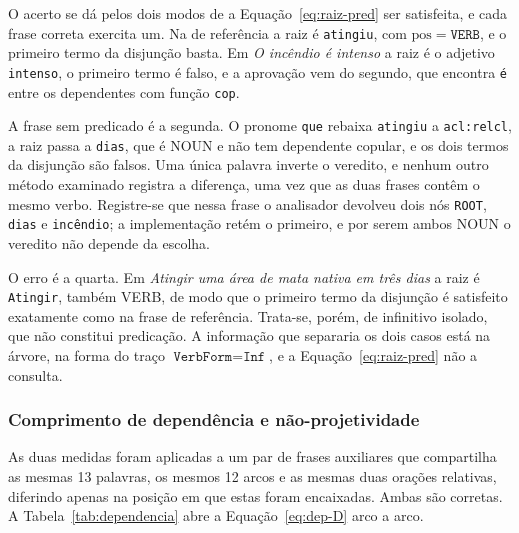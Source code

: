 O acerto se dá pelos dois modos de a Equação~\ref{eq:raiz-pred} ser satisfeita, e cada frase
correta exercita um. Na de referência a raiz é \texttt{atingiu}, com $\mathrm{pos} =
\texttt{VERB}$, e o primeiro termo da disjunção basta. Em \emph{O incêndio é intenso} a raiz é
o adjetivo \texttt{intenso}, o primeiro termo é falso, e a aprovação vem do segundo, que
encontra \texttt{é} entre os dependentes com função \texttt{cop}.

A frase sem predicado é a segunda. O pronome \texttt{que} rebaixa \texttt{atingiu} a
\texttt{acl:relcl}, a raiz passa a \texttt{dias}, que é NOUN e não tem dependente copular, e
os dois termos da disjunção são falsos. Uma única palavra inverte o veredito, e nenhum outro
método examinado registra a diferença, uma vez que as duas frases contêm o mesmo verbo.
Registre-se que nessa frase o analisador devolveu dois nós \texttt{ROOT}, \texttt{dias} e
\texttt{incêndio}; a implementação retém o primeiro, e por serem ambos NOUN o veredito não
depende da escolha.

O erro é a quarta. Em \emph{Atingir uma área de mata nativa em três dias} a raiz é
\texttt{Atingir}, também VERB, de modo que o primeiro termo da disjunção é satisfeito
exatamente como na frase de referência. Trata-se, porém, de infinitivo isolado, que não
constitui predicação. A informação que separaria os dois casos está na árvore, na forma do
traço $\texttt{VerbForm} = \texttt{Inf}$, e a Equação~\ref{eq:raiz-pred} não a consulta.

\subsubsection{Comprimento de dependência e não-projetividade}
\label{res:dependencia}

As duas medidas foram aplicadas a um par de frases auxiliares que compartilha as mesmas 13
palavras, os mesmos 12 arcos e as mesmas duas orações relativas, diferindo apenas na posição
em que estas foram encaixadas. Ambas são corretas. A Tabela~\ref{tab:dependencia} abre a
Equação~\ref{eq:dep-D} arco a arco.

